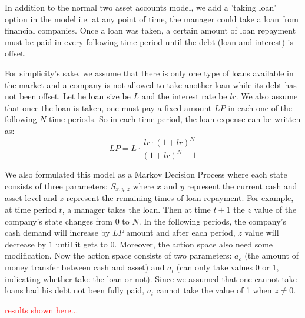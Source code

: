 \documentclass[12pt]{article}
\begin{document}
In addition to the normal two asset accounts model, we add a 'taking loan' option in the model i.e. at any point of time, the manager could take a loan from financial companies. Once a loan was taken, a certain amount of loan repayment must be paid in every following time period until the debt (loan and interest) is offset.   

For simplicity's sake, we assume that there is only one type of loans available in the market and a company is not allowed to take another loan while its debt has not been offset. Let he loan size be $L$ and the interest rate be $lr$. We also assume that once the loan is taken, one must pay a fixed amount $LP$ in each one of the following $N$ time periods. So in each time period, the loan expense can be written as: $$LP = L \cdot \frac{lr \cdot (1+lr)^N}{(1+lr)^N-1}$$
 
 We also formulated this model as a Markov Decision Process where each state consists of three parameters: $S_{x,y,z}$ where $x$ and $y$ represent the current cash and asset level and $z$ represent the remaining times of loan repayment. For example, at time period $t$, a manager takes the loan. Then at time $t+1$ the $z$ value of the company's state changes from $0$ to $N$. In the following periods, the company's cash demand will increase by $LP$ amount and after each period, $z$ value will decrease by $1$ until it gets to $0$. Moreover, the action space also need some modification. Now the action space consists of two parameters: $a_c$ (the amount of money transfer between cash and asset) and $a_l$ (can only take values 0 or 1, indicating whether take the loan or not). Since we assumed that one cannot take loans had his debt not been fully paid, $a_l$ cannot take the value of 1 when $z \neq 0$.
 
 \textcolor{red}{results shown here...}
\end{document}
